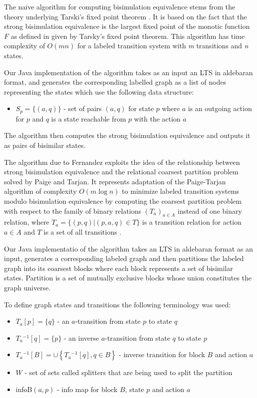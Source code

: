 The naive algorithm for computing bisimulation equivalence stems from the theory underlying 
Tarski's fixed point theorem \cite{ReactiveSystems2}. It is based on the fact that the strong bisimulation equivalence is 
the largest fixed point of the monotic function $F$ as defined in \cite{ReactiveSystems1} given by Tarsky's fixed 
point theorem. This algorithm has time complexity of $O(mn)$ for a labeled transition system with \emph{m} transitions and \emph{n} 
states. 

Our Java implementation of the algorithm takes as an input an LTS in aldebaran format, and generates the corresponding labelled graph as a list of nodes representing the states which use the following data structure:
\begin{itemize}
	\item $S_p=\{(a, q)\}$ - set of pairs $(a, q)$ for state $p$ where $a$ is an outgoing action for $p$ and $q$ is a state
	reachable from $p$ with the action $a$
\end{itemize}

The algorithm then computes the strong bisimulation equivalence and outputs it as pairs of bisimilar states.

The algorithm due to Fernandez exploits the idea of the relationship between strong bisimulation equivalence 
and the relational coarsest partition problem solved by Paige and Tarjan. It represents adaptation of the 
Paige-Tarjan algorithm of complexity $O(m \log n)$ to minimize labeled transition systems modulo bisimulation 
equivalence by computing the coarsest partition problem with respect to the family of binary relations 
$\left(T_a\right)_{a\in A}$ instead of one binary relation, where $T_a=\{(p,q)|(p,a,q)\in T\}$ is a transition 
relation for action $a\in A$ and $T$ is a set of all transitions \cite{PaigeTarjan}\cite{Fernandez}.

Our Java implementatio of the algorithm takes an LTS in aldebaran format as an input, generates a 
corresponding labeled graph and then partitions the labeled graph into its coarsest blocks where each block represents 
a set of bisimilar states. Partition is a set of mutually exclusive blocks whose union constitutes the graph universe.

To define graph states and transitions the following terminology was used: 
\begin{itemize}
	\item $T_a[p]=\{q\}$ - an $a$-transition from state $p$ to state $q$
	\item $T_a{}^{-1}[q]=\{p\}$ - an inverse $a$-transition from state $q$ to state $p$
	\item $T_a{}^{-1}[B]=\cup \left\{T_a{}^{-1}[q],q\in B\right\}$ - inverse transition for block $B$ and action $a$
	\item $W$ - set of sets called splitters that are being used to split the partition
	\item infoB$(a, p)$ - info map for block $B$, state $p$ and action $a$
\end{itemize}

